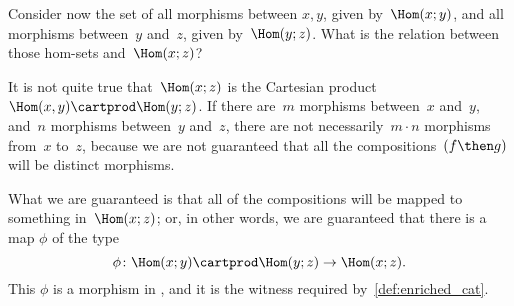 {\begin{example}
        Consider now the set of all morphisms between $x, y$, given by~$\Hom(x;y)$, and all morphisms between~$y$ and~$z$, given by~$\Hom(y; z)$.
        What is the relation between those hom-sets and~$\Hom(x; z)$?

        It is not quite true that~$\Hom(x; z)$ is the Cartesian product~$\Hom(x, y) \cartprod \Hom(y; z)$.
        If there are~$m$ morphisms between~$x$ and~$y$, and~$n$ morphisms between~$y$ and~$z$, there are not necessarily~$m \cdot n$ morphisms from~$x$ to~$z$, because we are not guaranteed that all the compositions~$(f\then g)$ will be distinct morphisms.

        What we are guaranteed is that all of the compositions will be mapped to something in~$\Hom(x; z)$; or, in other words, we are guaranteed that there is a map $\phi$ of the type
        \begin{equation}
            \phi \colon \Hom(x; y) \cartprod \Hom(y; z) \rightarrow \Hom(x; z).
        \end{equation}
        This $\phi$ is a morphism in \Set, and it is the witness required by~\cref{def:enriched_cat}.

    \end{example}
}

